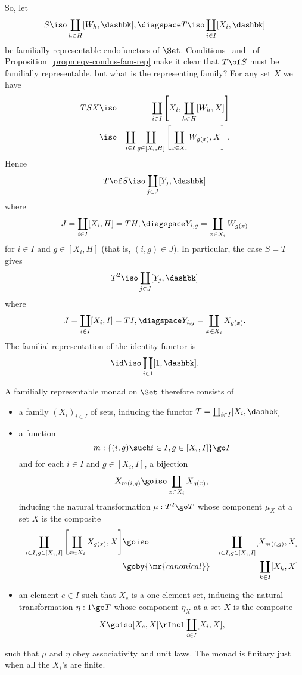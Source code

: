 So, let 
\[
S \iso \coprod_{h\in H} [W_h, \dashbk],
\diagspace
T \iso \coprod_{i\in I} [X_i, \dashbk]
\]
be familially representable endofunctors of $\Set$.
Conditions~ and~ of
Proposition~\ref{propn:eqv-condns-fam-rep} make it clear that $T\of S$ must
be familially representable, but what is the representing family?  For any
set $X$ we have
%
\begin{eqnarray*}
TSX	&\iso	&\coprod_{i\in I} 
		\left[X_i, \coprod_{h\in H} [W_h, X] \right]	\\
	&\iso	&\coprod_{i\in I} \coprod_{g\in [X_i, H]}
		\left[\coprod_{x\in X_i} W_{g(x)}, X \right].	
\end{eqnarray*}
%
Hence
\[
T\of S \iso \coprod_{j\in J} [Y_j, \dashbk]
\]
where
\[
J = \coprod_{i\in I} [X_i, H] = TH,
\diagspace
Y_{i,g} = \coprod_{x\in X_i} W_{g(x)} 
\]
for $i\in I$ and $g\in [X_i, H]$ (that is, $(i,g) \in J$).  In particular, the
case $S=T$ gives
\[
T^2 \iso \coprod_{j\in J} [Y_j, \dashbk]
\]
where
\[
J = \coprod_{i\in I} [X_i, I] = TI,
\diagspace
Y_{i,g} = \coprod_{x\in X_i} X_{g(x)}. 
\]
The familial representation of the identity functor is
\[
\id \iso \coprod_{i\in 1} [1, \dashbk].
\]

A familially representable monad on $\Set$ therefore consists of
%
\begin{itemize}
\item a family $(X_i)_{i\in I}$ of sets, inducing the functor $T =
\coprod_{i\in I} [X_i, \dashbk]$
\item a function
\[
m: \{ (i, g) \such i \in I, g \in [X_i, I] \}  \go  I
\]
and for each $i\in I$ and $g\in [X_i, I]$, a bijection
\[
X_{m(i,g)} \goiso \coprod_{x\in X_i} X_{g(x)},
\]
inducing the natural transformation $\mu: T^2 \go T$ whose component
$\mu_X$ at a set $X$ is the composite
% 
\begin{eqnarray*}
\coprod_{i\in I, g\in [X_i, I]} 
\left[ \coprod_{x\in X_i} X_{g(x)}, X \right] 
&
\goiso
&
\coprod_{i\in I, g\in [X_i, I]} [X_{m(i,g)}, X]
\\
&
\goby{\mr{canonical}}
&
\coprod_{k\in I} [X_k, X]
\end{eqnarray*}
% 
\item an element $e\in I$
such that $X_e$ is a one-element set, inducing the
natural transformation $\eta: 1 \go T$ whose component $\eta_X$ at a set
$X$ is the composite
\[
X \goiso [X_e,X] \rIncl \coprod_{i\in I} [X_i, X],
\]
\end{itemize}
%
such that $\mu$ and $\eta$ obey associativity and unit laws.  The monad
is finitary just when all the $X_i$'s are finite.

